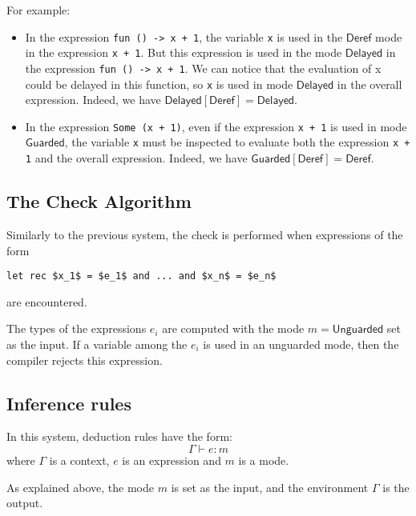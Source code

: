 \documentclass{article}
\newcommand{\Deref}{\mathsf{Deref}}
\newcommand{\Unguarded}{\mathsf{Unguarded}}
\newcommand{\Guarded}{\mathsf{Guarded}}
\newcommand{\Delayed}{\mathsf{Delayed}}
\begin{document}
For example:
\begin{itemize}
  \item In the expression \lstinline|fun () -> x + 1|, the variable
    \lstinline|x| is used in the $\Deref$ mode in the expression
    \lstinline|x + 1|. But this expression is used in the mode $\Delayed$ in the
    expression \lstinline|fun () -> x + 1|. We can notice that the evaluation of
    x could be delayed in this function, so \lstinline|x| is used in mode
    $\Delayed$ in the overall expression. Indeed, we have
    $\Delayed [\Deref] = \Delayed$.

  \item In the expression \lstinline|Some (x + 1)|, even if the expression
    \lstinline|x + 1| is used in mode $\Guarded$, the variable \lstinline|x|
    must be inspected to evaluate both the expression \lstinline|x + 1| and the
    overall expression. Indeed, we have $\Guarded [\Deref] = \Deref$.
\end{itemize}

\subsection{The Check Algorithm}

Similarly to the previous system, the check is performed when expressions of the
form
\begin{lstlisting}[mathescape=true]
  let rec $x_1$ = $e_1$ and ... and $x_n$ = $e_n$
\end{lstlisting}
are encountered.

The types of the expressions $e_i$ are computed with the mode $m = \Unguarded$
set as the input. If a variable among the $e_i$ is used in an unguarded mode,
then the compiler rejects this expression.

\subsection{Inference rules}
In this system, deduction rules have the form: $$\Gamma \vdash e: m$$
where $\Gamma$ is a context, $e$ is an expression and $m$ is a mode.

As explained above, the mode $m$ is set as the input, and the environment
$\Gamma$ is the output.
\end{document}

